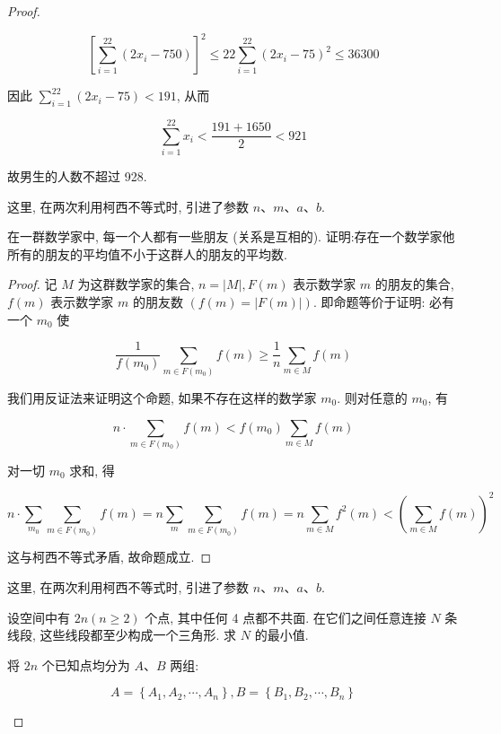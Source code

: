 \begin{proof}
\begin{example}
\begin{solution}
\begin{note}
\begin{solution}
	$$
	\left[\sum_{i=1}^{22}\left(2 x_{i}-750\right)\right]^{2} \leqslant 22 \sum_{i=1}^{22}\left(2 x_{i}-75\right)^{2} \leqslant 36300
	$$
	
	因此 $\sum_{i=1}^{22}\left(2 x_{i}-75\right)<191$, 从而
	
	$$
	\sum_{i=1}^{22} x_{i}<\frac{191+1650}{2}<921
	$$
	
	故男生的人数不超过 928.
\end{solution}
\begin{note}
	这里, 在两次利用柯西不等式时, 引进了参数 $n 、 m 、 a 、 b$.
\end{note}

\begin{example}
	在一群数学家中, 每一个人都有一些朋友 (关系是互相的). 证明:存在一个数学家他所有的朋友的平均值不小于这群人的朋友的平均数.
\end{example}
\begin{proof}
	记 $M$ 为这群数学家的集合, $n=|M|, F(m)$ 表示数学家 $m$ 的朋友的集合, $f(m)$ 表示数学家 $m$ 的朋友数 $(f(m)=|F(m)|)$. 即命题等价于证明: 必有一个 $m_{0}$ 使
	
	$$
	\frac{1}{f\left(m_{0}\right)} \sum_{m \in F\left(m_{0}\right)} f(m) \geqslant \frac{1}{n} \sum_{m \in M} f(m)
	$$
	
	我们用反证法来证明这个命题, 如果不存在这样的数学家 $m_{0}$. 则对任意的 $m_{0}$, 有
	
	$$
	n \cdot \sum_{m \in F\left(m_{0}\right)} f(m)<f\left(m_{0}\right) \sum_{m \in M} f(m)
	$$
	
	对一切 $m_{0}$ 求和, 得
	
	$$
	n \cdot \sum_{m_{0}} \sum_{m \in F\left(m_{0}\right)} f(m)=n \sum_{m} \sum_{m \in F\left(m_{0}\right)} f(m)=n \sum_{m \in M} f^{2}(m)<\left(\sum_{m \in M} f(m)\right)^{2}
	$$
	
	这与柯西不等式矛盾, 故命题成立.
\end{proof}
\begin{note}
	这里, 在两次利用柯西不等式时, 引进了参数 $n 、 m 、 a 、 b$.
\end{note}

\begin{example}
	设空间中有 $2 n(n \geqslant 2)$ 个点, 其中任何 4 点都不共面. 在它们之间任意连接 $N$ 条线段, 这些线段都至少构成一个三角形. 求 $N$ 的最小值.
\end{example}
\begin{solution}
	将 $2 n$ 个已知点均分为 $A 、 B$ 两组:
	
	$$
	A=\left\{A_{1}, A_{2}, \cdots, A_{n}\right\}, B=\left\{B_{1}, B_{2}, \cdots, B_{n}\right\}
	$$
	

\end{solution}
\end{note}
\end{solution}
\end{example}
\end{proof}
